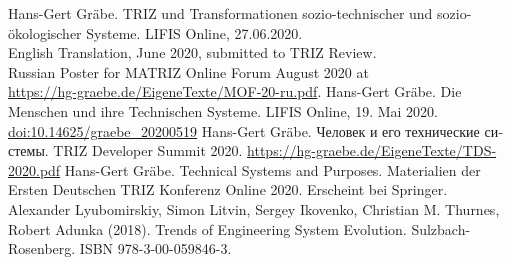 \documentclass[11pt,a4paper]{article}
\begin{document}
\begin{thebibliography}{xxx}
 Hans-Gert Gräbe.  TRIZ und Transformationen
  sozio-technischer und sozio-ökologischer Systeme. LIFIS Online,
  27.06.2020.\\ English Translation, June 2020, submitted to TRIZ
  Review.\\ Russian Poster for MATRIZ Online Forum August 2020 at
  \\ \url{https://hg-graebe.de/EigeneTexte/MOF-20-ru.pdf}.
 Hans-Gert Gräbe. Die Menschen und ihre Technischen
  Systeme. LIFIS Online, 19. Mai 2020. \url{doi:10.14625/graebe_20200519} 
 Hans-Gert Gräbe.  \foreignlanguage{russian}{Человек и
  его технические системы}.  TRIZ Developer Summit 2020.
  \url{https://hg-graebe.de/EigeneTexte/TDS-2020.pdf}
 Hans-Gert Gräbe.  Technical Systems and
  Purposes. Materialien der Ersten Deutschen TRIZ Konferenz Online 2020.
  Erscheint bei Springer.
 Alexander Lyubomirskiy, Simon Litvin, Sergey Ikovenko,
  Christian M. Thurnes, Robert Adunka (2018). Trends of Engineering System
  Evolution. Sulzbach-Rosenberg.  ISBN 978-3-00-059846-3.
\end{thebibliography}
\end{document}
